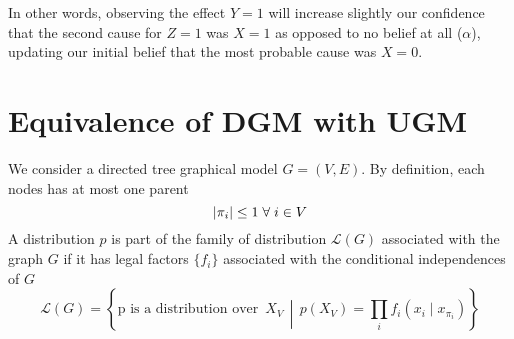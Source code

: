 \documentclass{article}
\numberwithin{equation}{section}
\newcommand{\s}{\hspace{0.1cm}}
\theoremstyle{named}
\begin{document}
In other words, observing the effect $Y = 1$ will increase slightly our confidence 
that the second cause for $Z = 1$ was $X = 1$ as opposed to no belief at all 
($\alpha$), updating our initial belief that the 
most probable cause was $X = 0$.


\section{Equivalence of DGM with UGM}
We consider a directed tree graphical model $G = (V, E)$. By definition, each nodes has at most 
one parent 
\[
        |\pi_i| \leq 1\s \forall \s i \in V 
\]
A distribution $p$ is part of the family of distribution $\mathcal{L}(G)$
associated with the graph $G$ if it has legal factors $\{f_i\}$ associated with
the conditional 
independences of $G$
\[
        \mathcal{L}(G) = \left\{ \text{p is a distribution over }\, X_V
        \,\middle\vert\, 
        p(X_V) = \prod_{i} f_i(x_i \mid x_{\pi_i})
        \right\}
\]
\end{document}
